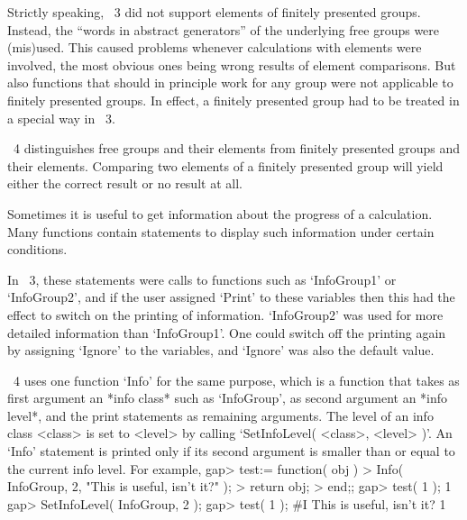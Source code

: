


Strictly speaking, {\GAP}~3 did not support elements of finitely
presented groups.
Instead, the ``words in abstract generators'' of the underlying free
groups were (mis)used.
This caused problems whenever calculations with elements were involved,
the most obvious ones being wrong results of element comparisons.
But also functions that should in principle work for any group were not
applicable to finitely presented groups.
In effect, a finitely presented group had to be treated in a special way
in {\GAP}~3.

{\GAP}~4 distinguishes free groups and their elements from finitely
presented groups and their elements.
Comparing two elements of a finitely presented group will yield either
the correct result or no result at all.



Sometimes it is useful to get information about the progress of a
calculation.
Many {\GAP} functions contain statements to display such information
under certain conditions.

In {\GAP}~3, these statements were calls to functions such as
`InfoGroup1' or `InfoGroup2', and if the user assigned `Print' to
these variables then this had the effect to switch on the printing of
information.
`InfoGroup2' was used for more detailed information than `InfoGroup1'.
One could switch off the printing again by assigning `Ignore' to the
variables, and `Ignore' was also the default value.

{\GAP}~4 uses one function `Info' for the same purpose,
which is a function that takes as first argument an *info class* such as
`InfoGroup', as second argument an *info level*, and the print statements
as remaining arguments.
The level of an info class <class> is set to <level> by calling
`SetInfoLevel( <class>, <level> )'.
An `Info' statement is printed only if its second argument is smaller than
or equal to the current info level.
For example,
\begintt
    gap> test:= function( obj )
    > Info( InfoGroup, 2, "This is useful, isn't it?" );
    > return obj;
    > end;;
    gap> test( 1 );
    1
    gap> SetInfoLevel( InfoGroup, 2 );
    gap> test( 1 );
    #I  This is useful, isn't it?
    1
\endtt


